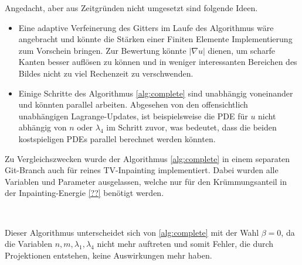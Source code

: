 \documentclass{mythesis}
\begin{document}
Angedacht, aber aus Zeitgründen nicht umgesetzt sind folgende Ideen.
\begin{itemize}
    \item
	Eine adaptive Verfeinerung des Gitters im Laufe des Algorithmus wäre angebracht und könnte die Stärken einer Finiten Elemente Implementierung zum Vorschein bringen.
	Zur Bewertung könnte $|\nabla u|$ dienen, um scharfe Kanten besser auflösen zu können und in weniger interessanten Bereichen des Bildes nicht zu viel Rechenzeit zu verschwenden.
    \item
	Einige Schritte des Algorithmus \ref{alg:complete} sind unabhängig voneinander und könnten parallel arbeiten.
	Abgesehen von den offensichtlich unabhängigen Lagrange-Updates, ist beispielsweise die PDE für $u$ nicht abhängig von $n$ oder $\lambda_4$ im Schritt zuvor, was bedeutet, dass die beiden kostspieligen PDEs parallel berechnet werden könnten.
\end{itemize}

Zu Vergleichszwecken wurde der Algorithmus \ref{alg:complete} in einem separaten Git-Branch auch für reines TV-Inpainting implementiert.
Dabei wurden alle Variablen und Parameter ausgelassen, welche nur für den Krümmungsanteil in der Inpainting-Energie \ref{??} benötigt werden.

\begin{algorithm}[TV Inpainting] \label{alg:tv}
     \\
    \begin{algorithmic}
	\EndFor
    \end{algorithmic}
    \begin{note}
	Dieser Algorithmus unterscheidet sich von \ref{alg:complete} mit der Wahl $\beta = 0$, da die Variablen $n, m, \lambda_1, \lambda_4$ nicht mehr auftreten und somit Fehler, die durch Projektionen entstehen, keine Auswirkungen mehr haben.
    \end{note}
\end{algorithm}
\end{document}
